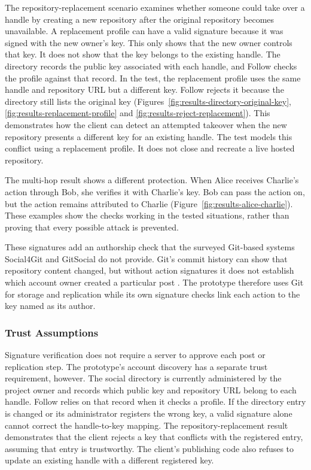 The repository-replacement scenario examines whether someone could take
over a handle by creating a new repository after the original repository
becomes unavailable. A replacement profile can have a valid signature
because it was signed with the new owner's key. This only shows that the
new owner controls that key. It does not show that the key belongs to the
existing handle. The directory records the public key associated with
each handle, and Follow checks the profile against that record. In the
test, the replacement profile uses the same handle and repository URL but
a different key. Follow rejects it because the directory still lists the
original key (Figures~\ref{fig:results-directory-original-key},
\ref{fig:results-replacement-profile} and
\ref{fig:results-reject-replacement}). This demonstrates how the client
can detect an attempted takeover when the new repository presents a
different key for an existing handle. The test models this conflict using
a replacement profile. It does not close and recreate a live hosted
repository.

The multi-hop result shows a different protection. When Alice receives
Charlie's action through Bob, she verifies it with Charlie's key. Bob can
pass the action on, but the action remains attributed to Charlie
(Figure~\ref{fig:results-alice-charlie}). These examples show the checks
working in the tested situations, rather than proving that every possible
attack is prevented.

These signatures add an authorship check that the surveyed Git-based
systems Social4Git and GitSocial do not provide. Git's commit history can
show that repository content changed, but without action signatures it
does not establish which account owner created a particular post
\cite{social4git2026,gitsocial2026}. The prototype therefore uses Git for
storage and replication while its own signature checks link each action
to the key named as its author.

\subsubsection{Trust Assumptions}\label{sec:trust-assumptions}

Signature verification does not require a server to approve each post or
replication step. The prototype's account discovery has a separate trust
requirement, however. The social directory is currently administered by
the project owner and records which public key and repository URL belong
to each handle. Follow relies on that record when it checks a profile. If
the directory entry is changed or its administrator registers the wrong
key, a valid signature alone cannot correct the handle-to-key mapping.
The repository-replacement result demonstrates that the client rejects a
key that conflicts with the registered entry, assuming that entry is
trustworthy. The client's publishing code also refuses to update an
existing handle with a different registered key.

